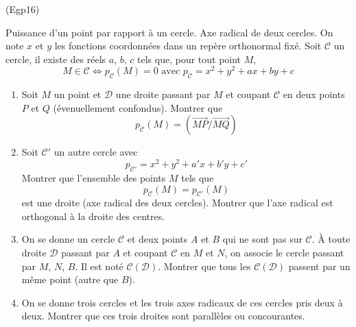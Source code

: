 \begin{tiny}(Egp16)\end{tiny} Puissance d'un point par rapport à un cercle. Axe radical de deux cercles.\newline
On note $x$ et $y$ les fonctions coordonnées dans un repère orthonormal fixé. Soit $\mathcal{C}$ un cercle, il existe des réels $a$, $b$, $c$ tels que, pour tout point $M$,
\begin{displaymath}
 M \in \mathcal{C}
\Leftrightarrow p_{\mathcal{C}}(M)=0
\text{ avec }
p_{\mathcal{C}} = x^2 + y^2 +ax+by+c
\end{displaymath}
\begin{enumerate}
 \item Soit $M$ un point et $\mathcal{D}$ une droite passant par $M$ et coupant $\mathcal{C}$ en deux points $P$ et $Q$ (évenuellement confondus). Montrer que
\begin{displaymath}
 p_{\mathcal{C}}(M) = (\overrightarrow{MP}/\overrightarrow{MQ})
\end{displaymath}
\item Soit $\mathcal{C}'$ un autre cercle avec
\begin{displaymath}
p_{\mathcal{C}'} = x^2 + y^2 +a'x+b'y+c'
\end{displaymath}
Montrer que l'ensemble des points $M$ tels que 
\begin{displaymath}
 p_{\mathcal{C}}(M) = p_{\mathcal{C}'}(M)
\end{displaymath}
est une droite (axe radical des deux cercles). Montrer que l'axe radical est orthogonal à la droite des centres.
\item On se donne un cercle $\mathcal{C}$ et deux points $A$ et $B$ qui ne sont pas sur $\mathcal{C}$. \`A toute droite $\mathcal{D}$ passant par $A$ et coupant $\mathcal{C}$ en $M$ et $N$, on associe le cercle passant par $M$, $N$, $B$. Il est noté $\mathcal{C}(\mathcal{D})$. Montrer que tous les $\mathcal{C}(\mathcal{D})$ passent par un même point (autre que $B$).
\item On se donne trois cercles et les trois axes radicaux de ces cercles pris deux à deux. Montrer que ces trois droites sont parallèles ou concourantes.
\end{enumerate}

 